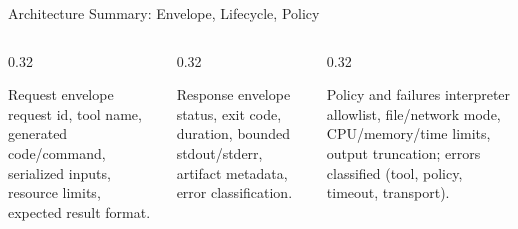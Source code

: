 \documentclass[aspectratio=169,11pt]{beamer}
\begin{document}
\begin{frame}{Architecture Summary: Envelope, Lifecycle, Policy}
  \centering
  \vspace{0.25cm}

  \scriptsize
  \begin{columns}[T,totalwidth=\textwidth]
    \begin{column}{0.32\textwidth}
      \begin{block}{Request envelope}
        request id, tool name, generated code/command, serialized inputs,
        resource limits, expected result format.
      \end{block}
    \end{column}
    \begin{column}{0.32\textwidth}
      \begin{block}{Response envelope}
        status, exit code, duration, bounded stdout/stderr, artifact metadata,
        error classification.
      \end{block}
    \end{column}
    \begin{column}{0.32\textwidth}
      \begin{alertblock}{Policy and failures}
        interpreter allowlist, file/network mode, CPU/memory/time limits,
        output truncation; errors classified (tool, policy, timeout,
        transport).
      \end{alertblock}
    \end{column}
  \end{columns}
\end{frame}
\end{document}
